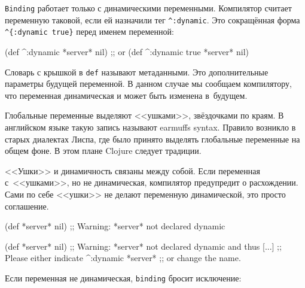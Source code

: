 \label{dynamic-vars}


\verb|Binding| работает только с динамическими переменными. Компилятор считает
переменную таковой, если ей назначили тег \verb|^:dynamic|. Это сокращённая
форма \verb|^{:dynamic true}| перед именем переменной:

\begin{english}
  \begin{clojure}
(def ^:dynamic *server* nil)
;; or
(def ^{:dynamic true} *server* nil)
  \end{clojure}
\end{english}

Словарь с крышкой в \verb|def| называют метаданными. Это дополнительные
параметры будущей переменной. В данном случае мы сообщаем компилятору, что
переменная динамическая и может быть изменена в~будущем.

Глобальные переменные выделяют <<ушками>>, звёздочками по краям. В английском
языке такую запись называют earmuffs syntax. Правило возникло в старых диалектах
Лиспа, где было принято выделять глобальные переменные на общем фоне. В этом
плане Clojure следует традиции.


<<Ушки>> и динамичность связаны между собой. Если переменная с~<<ушками>>, но не
динамическая, компилятор предупредит о расхождении. Сами по себе <<ушки>> не
делают переменную динамической, это просто соглашение.

\ifnarrow

\begin{english}
  \begin{clojure}
(def *server* nil)
;; Warning: *server* not declared dynamic
  \end{clojure}
\end{english}

\else

\begin{english}
  \begin{clojure}
(def *server* nil)
;; Warning: *server* not declared dynamic and thus [...]
;; Please either indicate ^:dynamic *server*
;; or change the name.
  \end{clojure}
\end{english}

\fi

\noindent
Если переменная не динамическая, \verb|binding| бросит исключение:

